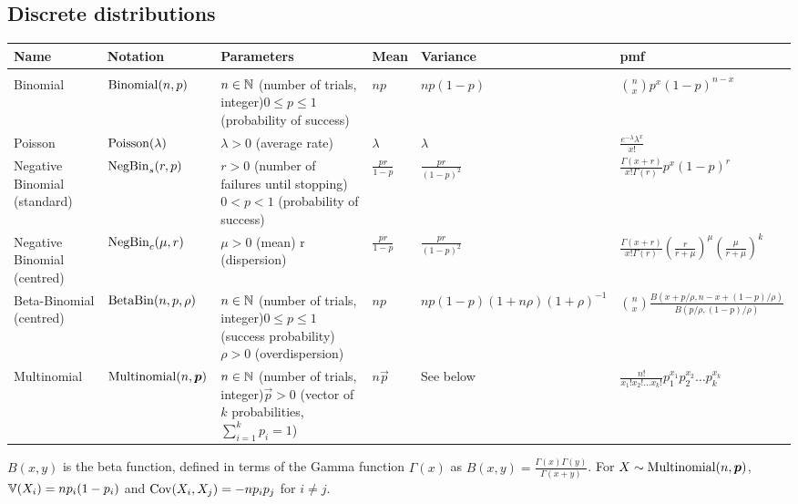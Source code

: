 \documentclass[thesis.tex]{subfiles}
\begin{document}
\begin{landscape}
\section{Discrete distributions}
\begin{tabular}{llp{3.5cm}lll}
Name & Notation & Parameters & Mean & Variance & pmf \\
\hline \\
Binomial & $\operatorname{Binomial}(n, p)$ & $n \in \mathbb{N}$ (number of trials, integer)\newline $0 \leq p \leq 1$ (probability of success) & $np$ & $np(1-p)$ & ${n \choose x}p^x(1-p)^{n-x}$ \\
Poisson & $\operatorname{Poisson}(\lambda)$ & $\lambda > 0$ (average rate) & $\lambda$ & $\lambda$ & $\frac{e^{-\lambda}\lambda^x}{x!}$ \\
Negative Binomial (standard) & $\operatorname{NegBin}_{s}(r, p)$ & $r > 0$ (number of failures until stopping)\newline $0 < p < 1$ (probability of success) & $\frac{pr}{1-p}$ & $\frac{pr}{(1-p)^2}$ & $\frac{\Gamma(x+r)}{x! \Gamma(r)} p^x (1-p)^r$ \\
Negative Binomial (centred) & $\operatorname{NegBin}_{c}(\mu, r)$ & $\mu > 0$ (mean) \newline r (dispersion) & $\frac{pr}{1-p}$ & $\frac{pr}{(1-p)^2}$ & $\frac{\Gamma(x+r)}{x! \Gamma(r)} \left( \frac{r}{r+\mu} \right)^\mu \left( \frac{\mu}{r+\mu} \right)^k$ \\
Beta-Binomial (centred) & $\operatorname{BetaBin}(n, p, \rho)$ & $n \in \mathbb{N}$ (number of trials, integer)\newline $0 \leq p \leq 1$ (success probability)\newline $\rho > 0$ (overdispersion) & $np$ & $np(1-p)(1+n\rho)(1+\rho)^{-1}$ & ${n \choose x} \frac{B(x+p/\rho, n-x+(1-p)/\rho)}{B(p/\rho, (1-p)/\rho)}$ \\
Multinomial & $\operatorname{Multinomial}(n, \bm{p})$ & $n \in \mathbb{N}$ (number of trials, integer)\newline $\vec{p} > 0$ (vector of $k$ probabilities, $\sum_{i=1}^k p_i = 1$) & $n \vec{p}$ & See below & $\frac{n!}{x_1!x_2!\ldots x_k!}p_1^{x_1}p_2^{x_2}\ldots p_k^{x_k}$ \\
\end{tabular}

$B(x,y)$ is the beta function, defined in terms of the Gamma function $\Gamma(x)$ as $B(x,y) = \frac{\Gamma(x)\Gamma(y)}{\Gamma(x+y)}$.
For $X \sim \operatorname{Multinomial}(n, \bm{p})$, $\operatorname{\mathbb{V}}(X_i) = np_i(1-p_i)$ and $\operatorname{Cov}(X_i, X_j) = -np_ip_j$ for $i \neq j$.
\end{landscape}
\end{document}

